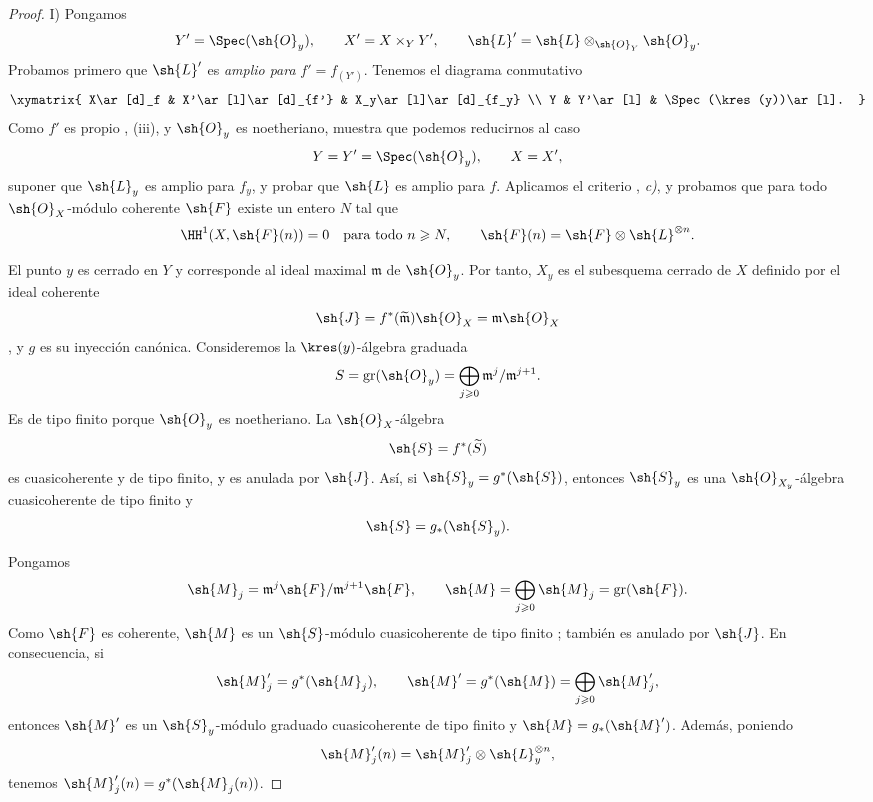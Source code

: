 \documentclass[oneside]{amsart}
\renewcommand{\geq}{\geqslant}
\newcommand{\oldpage}[2][]{{\marginnote{\normalfont\textbf{#1}~|~#2}}\ignorespaces}
\begin{document}
\begin{proof}
\oldpage[III]{145}

\noindent I) Pongamos
\[
  Y'=\Spec(\sh{O}_y),\qquad
  X'=X\times_Y Y',\qquad
  \sh{L}'=\sh{L}\otimes_{\sh{O}_Y}\sh{O}_y.
\]
Probamos primero que $\sh{L}'$ es \emph{amplio para} $f'=f_{(Y')}$. Tenemos
el diagrama conmutativo
\[
  \xymatrix{
    X\ar[d]_f
      &
    X'\ar[l]\ar[d]_{f'}
      &
    X_y\ar[l]\ar[d]_{f_y}
    \\
    Y
      &
    Y'\ar[l]
      &
    \Spec(\kres(y))\ar[l].
  }
\]
Como $f'$ es propio , (iii), y $\sh{O}_y$ es
noetheriano,  muestra que podemos reducirnos al caso
\[
  Y=Y'=\Spec(\sh{O}_y),\qquad X=X',
\]
suponer que $\sh{L}_y$ es amplio para $f_y$, y probar que $\sh{L}$
es amplio para $f$. Aplicamos el criterio
, \emph{c)}, y probamos que para todo
$\sh{O}_X$-módulo coherente $\sh{F}$ existe un entero $N$ tal que
\[
  \HH^1(X,\sh{F}(n))=0
  \quad\text{para todo }n\geq N,
  \qquad
  \sh{F}(n)=\sh{F}\otimes\sh{L}^{\otimes n}.
\]

El punto $y$ es cerrado en $Y$ y corresponde al ideal maximal
$\mathfrak m$ de $\sh{O}_y$. Por tanto, $X_y$ es el
subesquema cerrado de $X$ definido por el ideal coherente
\[
  \sh{J}
  =
  f^*(\widetilde{\mathfrak m})\sh{O}_X
  =
  \mathfrak m\sh{O}_X
\]
, y $g$ es su inyección canónica. Consideremos
la $\kres(y)$-álgebra graduada
\[
  S=\operatorname{gr}(\sh{O}_y)
   =\bigoplus_{j\geq0}
      \mathfrak m^j/\mathfrak m^{j+1}.
\]
Es de tipo finito porque $\sh{O}_y$ es noetheriano. La
$\sh{O}_X$-álgebra
\[
  \sh{S}=f^*(\widetilde S)
\]
es cuasicoherente y de tipo finito, y es anulada por
$\sh{J}$. Así, si $\sh{S}_y=g^*(\sh{S})$, entonces $\sh{S}_y$ es una
$\sh{O}_{X_y}$-álgebra cuasicoherente de tipo finito y
\[
  \sh{S}=g_*(\sh{S}_y).
\]

Pongamos
\[
  \sh{M}_j
  =
  \mathfrak m^j\sh{F}/\mathfrak m^{j+1}\sh{F},
  \qquad
  \sh{M}
  =
  \bigoplus_{j\geq0}\sh{M}_j
  =
  \operatorname{gr}(\sh{F}).
\]
Como $\sh{F}$ es coherente, $\sh{M}$ es un
$\sh{S}$-módulo cuasicoherente de tipo finito ; también es
anulado por $\sh{J}$. En consecuencia, si
\[
  \sh{M}'_j=g^*(\sh{M}_j),
  \qquad
  \sh{M}'=g^*(\sh{M})
    =\bigoplus_{j\geq0}\sh{M}'_j,
\]
entonces $\sh{M}'$ es un $\sh{S}_y$-módulo graduado cuasicoherente de
tipo finito y $\sh{M}=g_*(\sh{M}')$. Además, poniendo
\[
  \sh{M}'_j(n)
  =
  \sh{M}'_j\otimes\sh{L}_y^{\otimes n},
\]
tenemos $\sh{M}'_j(n)=g^*(\sh{M}_j(n))$.


\end{proof}
\end{document}
